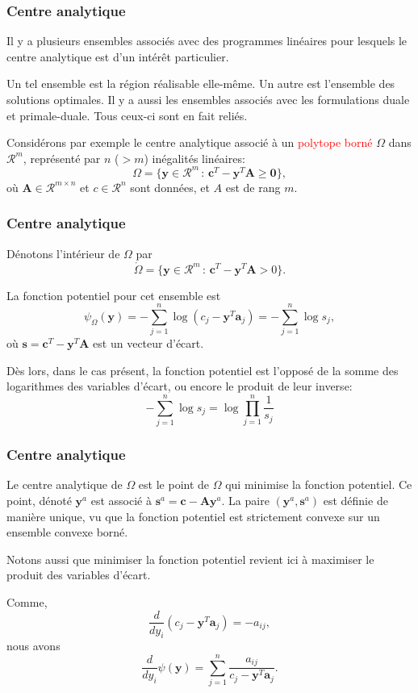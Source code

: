 \documentclass[usepdftitle=false, aspectratio=169]{beamer}
\def\ba{\boldsymbol{a}}
\def\bc{\boldsymbol{c}}
\def\bs{\boldsymbol{s}}
\def\by{\boldsymbol{y}}
\def\bA{\boldsymbol{A}}
\def\bzero{\boldsymbol{0}}
\def\RR{\mathcal{R}}
\begin{document}
\begin{frame}
\frametitle{Centre analytique}

Il y a plusieurs ensembles associés avec des programmes linéaires pour lesquels le centre analytique est d'un intérêt particulier.

\mbox{}

Un tel ensemble est la région réalisable elle-même. Un autre est l'ensemble des solutions optimales. Il y a aussi les ensembles associés avec les formulations duale et primale-duale. Tous ceux-ci sont en fait reliés.

\mbox{}

Considérons par exemple le centre analytique associé à un \textcolor{red}{polytope borné} $\Omega$ dans $\RR^m$, représenté par $n$ ($> m$) inégalités linéaires:
\[
\Omega = \lbrace \by \in \RR^m \,:\, \bc^T - \by^T \bA \geq \bzero \rbrace,
\]
où $\bA \in \RR^{m \times n}$ et $c \in \RR^n$ sont données, et $A$ est de rang $m$.

\end{frame}

\begin{frame}
\frametitle{Centre analytique}

Dénotons l'intérieur de $\Omega$ par
\[
\mathring{\Omega} = \lbrace \by \in \RR^m \,:\, \bc^T - \by^T\bA > 0 \rbrace.
\]

\mbox{}

La fonction potentiel pour cet ensemble est
\[
\psi_{\Omega} (\by) = - \sum_{j = 1}^n \log (c_j - \by^T\ba_j) = -\sum_{j = 1}^n \log s_j,
\]
où $\bs = \bc^T - \by^T\bA$ est un vecteur d'écart.

\mbox{}

Dès lors, dans le cas présent, la fonction potentiel est l'opposé de la somme des logarithmes des variables d'écart, ou encore le produit de leur inverse:
$$
-\sum_{j = 1}^n \log s_j = \log \prod_{j = 1}^n \frac{1}{s_j}
$$

\end{frame}

\begin{frame}
\frametitle{Centre analytique}

Le centre analytique de $\Omega$ est le point de $\Omega$ qui minimise la fonction potentiel. Ce point, dénoté $\by^a$ est associé à $\bs^a = \bc - \bA\by^a$. La paire $(\by^a, \bs^a)$ est définie de manière unique, vu que la fonction potentiel est strictement convexe sur un ensemble convexe borné.

\mbox{}

Notons aussi que minimiser la fonction potentiel revient ici à maximiser le produit des variables d'écart.

\mbox{}

Comme,
$$
\frac{d}{dy_i} (c_j-\by^T\ba_j) = -a_{ij},
$$
nous avons
$$
\frac{d}{dy_i} \psi(\by) = \sum_{j = 1}^n \frac{a_{ij}}{c_j - \by^T\ba_j}.
$$

\end{frame}
\end{document}
